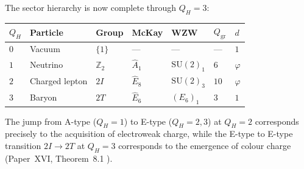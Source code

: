 \documentclass[11pt,a4paper]{article}
\theoremstyle{definition}\newtheorem{definition}[theorem]{Definition}
\theoremstyle{remark}
\newcommand{\vp}{\varphi}
\newcommand{\SU}{\mathrm{SU}}
\newcommand{\twoI}{2I}
\newcommand{\twoT}{2T}
\newcommand{\QH}{Q_H}
\newcommand{\Ztwo}{\mathbb{Z}_2}
\newcommand{\dimq}[1]{d_{#1}}
\begin{document}
The sector hierarchy is now complete through $\QH=3$:
\begin{center}
\renewcommand{\arraystretch}{1.35}
\begin{tabular}{lllllll}
\toprule
$\QH$ & Particle & Group & McKay & WZW & $Q_{\mathrm{gr}}$ & $\dimq{}$ \\
\midrule
$0$ & Vacuum & $\{1\}$ & --- & --- & --- & $1$ \\
$1$ & Neutrino & $\Ztwo$ & $\widehat{A}_1$ & $\SU(2)_1$ & $6$ & $\vp$ \\
$2$ & Charged lepton & $\twoI$ & $\widehat{E}_8$ & $\SU(2)_3$ & $10$ & $\vp$ \\
$3$ & Baryon & $\twoT$ & $\widehat{E}_6$ & $(E_6)_1$ & $3$ & $1$ \\
\bottomrule
\end{tabular}
\end{center}
The jump from A-type ($\QH=1$) to E-type ($\QH=2,3$) at $\QH=2$
corresponds precisely to the acquisition of electroweak charge, while
the E-type to E-type transition $\twoI\to\twoT$ at $\QH=3$ corresponds
to the emergence of colour charge (Paper~XVI,
Theorem~8.1%
).
\end{document}
